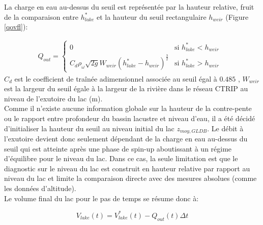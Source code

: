 \noindent La charge en eau au-dessus du seuil est représentée par la hauteur relative, fruit de la comparaison entre $h_{lake}^{*}$ et la hauteur du seuil rectangulaire $h_{weir}$ (Figure \ref{qovfl}):

\begin{align}\label{q_out}
Q_{out}=
\begin{cases}
 0 & \text{si $h_{lake}^{*}<h_{weir}$ }\\
 C_{d} \rho_{\omega} \sqrt{2g}W_{weir}(h_{lake}^{*}-h_{weir})^{\frac{3}{2}}& \text{si $h_{lake}^{*}>h_{weir}$}
\end{cases}
\end{align}
$C_{d}$ est le coefficient de traînée adimensionnel associée au seuil égal à $0.485$ \citep{lencastre1963}, $W_{weir}$ est la largeur du seuil égale à la largeur de la rivière dans le réseau CTRIP au niveau de l'exutoire du lac (m). \\

Comme il n'existe aucune information globale sur la hauteur de la contre-pente ou le rapport entre profondeur du bassin lacustre et niveau d'eau, il a été décidé d'initialiser la hauteur du seuil au niveau initial du lac $z_{moy, GLDB}$. Le débit à l'exutoire devient donc seulement dépendant de la charge en eau au-dessus du seuil qui est atteinte après une phase de spin-up aboutissant à un régime d'équilibre pour le niveau du lac. Dans ce cas, la seule limitation est que le diagnostic sur le niveau du lac est construit en hauteur relative par rapport au niveau du lac et limite la comparaison directe avec des mesures absolues (comme les données d'altitude). \\

\noindent Le volume final du lac pour le pas de temps se résume donc à:

\begin{equation}
V_{lake}(t)=V^{*}_{lake}(t) - Q_{out}(t)\Delta t
\end{equation}

